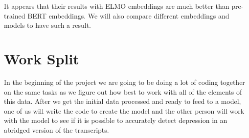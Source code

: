 It appears that their results with ELMO embeddings are much better than pre-trained BERT embeddings. We will also compare different embeddings and models to have such a result.



\newpage

\section{Work Split}

In the beginning of the project we are going to be doing a lot of coding together on the same tasks as we figure out how best to work with all of the elements of this data. After we get the initial data processed and ready to feed to a model, one of us will write the code to create the model and the other person will work with the model to see if it is possible to accurately detect depression in an abridged version of the transcripts. 